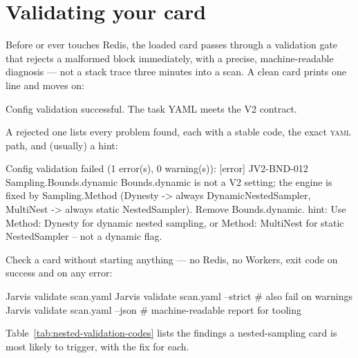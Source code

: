 \section{Validating your card}
\label{sec:nested-validation}

Before  or  ever touches Redis, the loaded card
passes through a validation gate that rejects a malformed  block
immediately, with a precise, machine-readable diagnosis --- not a stack trace three
minutes into a scan. A clean card prints one line and moves on:

\begin{terminal}
\begin{jout}
Config validation successful. The task YAML meets the V2 contract.
\end{jout}
\end{terminal}

A rejected one lists every problem found, each with a stable code, the exact
\textsc{yaml} path, and (usually) a hint:

\begin{terminal}
\begin{jout}
Config validation failed (1 error(s), 0 warning(s)):
  [error] JV2-BND-012  Sampling.Bounds.dynamic
          Bounds.dynamic is not a V2 setting; the engine is fixed by
          Sampling.Method (Dynesty -> always DynamicNestedSampler,
          MultiNest -> always static NestedSampler). Remove Bounds.dynamic.
          hint: Use Method: Dynesty for dynamic nested sampling, or
          Method: MultiNest for static NestedSampler -- not a dynamic flag.
\end{jout}
\end{terminal}

Check a card without starting anything --- no Redis, no Workers, exit code 
on success and  on any error:

\begin{terminal}
\begin{jcmd}
Jarvis validate scan.yaml
Jarvis validate scan.yaml --strict   # also fail on warnings
Jarvis validate scan.yaml --json     # machine-readable report for tooling
\end{jcmd}
\end{terminal}

Table~\ref{tab:nested-validation-codes} lists the findings a nested-sampling card is
most likely to trigger, with the fix for each.

